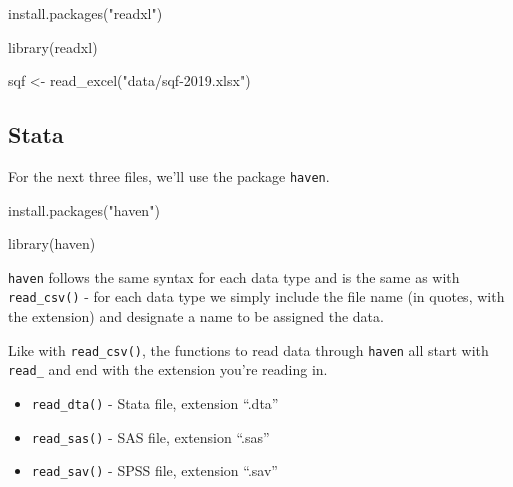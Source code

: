\documentclass[
]{krantz}
\makeatletter
\newenvironment{Shaded}{\begin{snugshade}}{\end{snugshade}}
\newcommand{\FunctionTok}[1]{\textcolor[rgb]{0,0,0}{#1}}
\newcommand{\NormalTok}[1]{#1}
\newcommand{\OtherTok}[1]{\textcolor[rgb]{0.37,0.37,0.37}{#1}}
\newcommand{\StringTok}[1]{\textcolor[rgb]{0.5,0.5,0.5}{#1}}
\providecommand{\tightlist}{%
  \setlength{\itemsep}{0pt}\setlength{\parskip}{0pt}}
\newenvironment{kframe}{%
\medskip{}
\setlength{\fboxsep}{.8em}
 \def\at@end@of@kframe{}%
 \ifinner\ifhmode%
  \def\at@end@of@kframe{\end{minipage}}%
  \begin{minipage}{\columnwidth}%
 \fi\fi%
 \def\FrameCommand##1{\hskip\@totalleftmargin \hskip-\fboxsep
 \colorbox{shadecolor}{##1}\hskip-\fboxsep
     \hskip-\linewidth \hskip-\@totalleftmargin \hskip\columnwidth}%
 \MakeFramed {\advance\hsize-\width
   \@totalleftmargin\z@ \linewidth\hsize
   \@setminipage}}%
 {\par\unskip\endMakeFramed%
 \at@end@of@kframe}
\renewenvironment{Shaded}{\begin{kframe}}{\end{kframe}}
\makeatother
\begin{document}
\begin{Shaded}
\begin{Highlighting}[]
\FunctionTok{install.packages}\NormalTok{(}\StringTok{"readxl"}\NormalTok{)}
\end{Highlighting}
\end{Shaded}

\begin{Shaded}
\begin{Highlighting}[]
\FunctionTok{library}\NormalTok{(readxl)}
\end{Highlighting}
\end{Shaded}

\begin{Shaded}
\begin{Highlighting}[]
\NormalTok{sqf }\OtherTok{\textless{}{-}} \FunctionTok{read\_excel}\NormalTok{(}\StringTok{"data/sqf{-}2019.xlsx"}\NormalTok{)}
\end{Highlighting}
\end{Shaded}

\hypertarget{stata}{%
\subsection{Stata}\label{stata}}

For the next three files, we'll use the package
\texttt{haven}.

\begin{Shaded}
\begin{Highlighting}[]
\FunctionTok{install.packages}\NormalTok{(}\StringTok{"haven"}\NormalTok{)}
\end{Highlighting}
\end{Shaded}

\begin{Shaded}
\begin{Highlighting}[]
\FunctionTok{library}\NormalTok{(haven)}
\end{Highlighting}
\end{Shaded}

\texttt{haven} follows the same syntax for each data type
and is the same as with \texttt{read\_csv()} - for each data
type we simply include the file name (in quotes, with the
extension) and designate a name to be assigned the data.

Like with \texttt{read\_csv()}, the functions to read data
through \texttt{haven} all start with \texttt{read\_} and
end with the extension you're reading in.

\begin{itemize}
\tightlist
\item
  \texttt{read\_dta()} - Stata file, extension ``.dta''
\item
  \texttt{read\_sas()} - SAS file, extension ``.sas''
\item
  \texttt{read\_sav()} - SPSS file, extension ``.sav''
\end{itemize}
\end{document}

